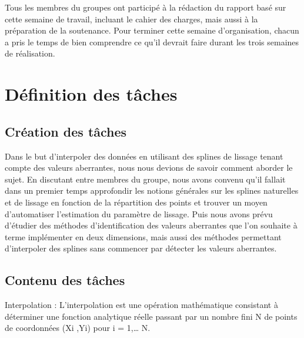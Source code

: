 \documentclass[a4paper,10pt]{article} %
\begin{document}
Tous les membres du groupes ont participé à la rédaction du rapport basé sur cette semaine de travail, incluant le cahier des charges, mais aussi à la préparation de la soutenance. Pour terminer cette semaine d'organisation, chacun a pris le temps de bien comprendre ce qu'il devrait faire durant les trois semaines de réalisation. 



\section{Définition des tâches}

	\subsection{Création des tâches}
	Dans le but d'interpoler des données en utilisant des splines de lissage tenant compte des valeurs aberrantes, nous nous devions de savoir comment aborder le sujet. En discutant entre membres du groupe, nous avons convenu qu'il fallait dans un premier temps approfondir les notions générales sur les splines naturelles et de lissage en fonction de la répartition des points et trouver un moyen d'automatiser l'estimation du paramètre de lissage. Puis nous avons prévu d'étudier des méthodes d'identification des valeurs aberrantes que l'on souhaite à terme implémenter en deux dimensions, mais aussi des méthodes permettant d'interpoler des splines sans commencer par détecter les valeurs aberrantes.

	\subsection{Contenu des tâches}
Interpolation :
            L’interpolation est une opération mathématique consistant à déterminer une fonction analytique réelle passant par un nombre fini N de points de coordonnées  (Xi ,Yi)  pour              i = 1,… N.
 
\end{document}
